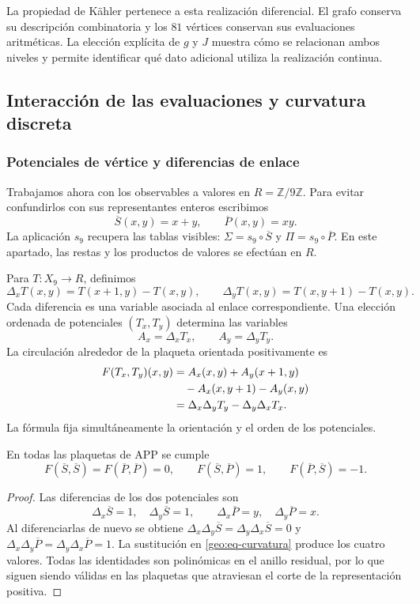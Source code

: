 La propiedad de Kähler pertenece a esta realización diferencial. El grafo conserva su descripción combinatoria y los $81$ vértices conservan sus evaluaciones aritméticas. La elección explícita de $g$ y $J$ muestra cómo se relacionan ambos niveles y permite identificar qué dato adicional utiliza la realización continua.

\subsection{Interacción de las evaluaciones y curvatura discreta}
\label{geo:curvatura}

\subsubsection{Potenciales de vértice y diferencias de enlace}

Trabajamos ahora con los observables a valores en $R=\mathbb Z/9\mathbb Z$. Para evitar confundirlos con sus representantes enteros escribimos
\[
 \overline S(x,y)=x+y,\qquad \overline P(x,y)=xy.
\]
La aplicación $s_9$ recupera las tablas visibles: $\Sigma=s_9\circ\overline S$ y $\Pi=s_9\circ\overline P$. En este apartado, las restas y los productos de valores se efectúan en $R$.

Para $T:X_9\to R$, definimos
\[
 \Delta_xT(x,y)=T(x+1,y)-T(x,y),\qquad
 \Delta_yT(x,y)=T(x,y+1)-T(x,y).
\]
Cada diferencia es una variable asociada al enlace correspondiente. Una elección ordenada de potenciales $(T_x,T_y)$ determina las variables
\[
 A_x=\Delta_xT_x,\qquad A_y=\Delta_yT_y.
\]
La circulación alrededor de la plaqueta orientada positivamente es
\begin{align}
 F(T_x,T_y)(x,y)
 &=A_x(x,y)+A_y(x+1,y)\notag\\
 &\quad-A_x(x,y+1)-A_y(x,y)\notag\\
 &=\Delta_x\Delta_yT_y-\Delta_y\Delta_xT_x.
 \label{geo:eq-curvatura}
\end{align}
La fórmula fija simultáneamente la orientación y el orden de los potenciales.

\begin{proposicion}
\label{geo:prop-curvatura}
En todas las plaquetas de APP se cumple
\[
 F(\overline S,\overline S)=F(\overline P,\overline P)=0,
 \qquad
 F(\overline S,\overline P)=1,
 \qquad F(\overline P,\overline S)=-1.
\]
\end{proposicion}

\begin{proof}
Las diferencias de los dos potenciales son
\[
 \Delta_x\overline S=1,\quad\Delta_y\overline S=1,
 \qquad
 \Delta_x\overline P=y,\quad\Delta_y\overline P=x.
\]
Al diferenciarlas de nuevo se obtiene $\Delta_x\Delta_y\overline S=\Delta_y\Delta_x\overline S=0$ y $\Delta_x\Delta_y\overline P=\Delta_y\Delta_x\overline P=1$. La sustitución en \eqref{geo:eq-curvatura} produce los cuatro valores. Todas las identidades son polinómicas en el anillo residual, por lo que siguen siendo válidas en las plaquetas que atraviesan el corte de la representación positiva.
\end{proof}

